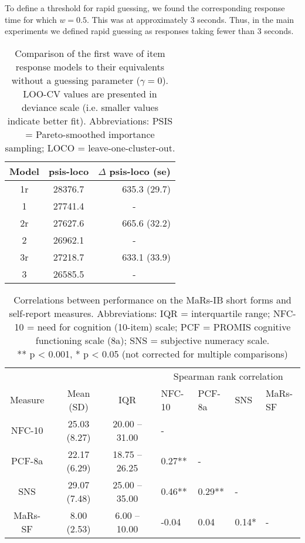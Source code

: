 \documentclass[a4paper,man,natbib]{apa6}
\begin{document}
To define a threshold for rapid guessing, we found the corresponding response time for which $w = 0.5$. This was at approximately 3 seconds. Thus, in the main experiments we defined rapid guessing as responses taking fewer than 3 seconds. 




\begin{table}
    \centering
    \begin{tabular*}{0.45\textwidth}{ccr}
    \toprule
    Model & psis-loco & $\Delta$ psis-loco (se) \\
    \midrule
    1r & 28376.7 & 635.3 (29.7) \\
    1 & 27741.4 & \multicolumn{1}{c}{-} \\
    \midrule
    2r & 27627.6 & 665.6 (32.2) \\
    2 & 26962.1 & \multicolumn{1}{c}{-} \\
    \midrule
    3r & 27218.7 & 633.1 (33.9) \\
    3 & 26585.5 & \multicolumn{1}{c}{-} \\
    \bottomrule
    \end{tabular*}
    \caption{\label{tab:2}\normalfont Comparison of the first wave of item response models to their equivalents without a guessing parameter ($\gamma = 0$). LOO-CV values are presented in deviance scale (i.e. smaller values indicate better fit). Abbreviations: PSIS = Pareto-smoothed importance sampling; LOCO = leave-one-cluster-out.}
    \label{table:2}
\end{table}

\begin{table}
\centering
\begin{tabular*}{\textwidth}{ccccccllll}
\toprule
 & & & & & & \multicolumn{4}{c}{Spearman rank correlation} \\
\cmidrule(lr){7-10}
Measure & & Mean (SD) & & IQR & &  NFC-10 & PCF-8a & SNS & MaRs-SF \\
\midrule
NFC-10 & & 25.03 (8.27) & & 20.00 -- 31.00 & & - &  &  & \\
PCF-8a   &  & 22.17 (6.29) & & 18.75 -- 26.25 & & 0.27** &  - &  &  \\
SNS   &  & 29.07 (7.48) & & 25.00 -- 35.00 & & 0.46** &  0.29** &  - &   \\
MaRs-SF & &   8.00 (2.53) & &   6.00 -- 10.00 & & -0.04 &  0.04 &  0.14* &  - \\
\bottomrule
\end{tabular*}
\captionsetup{width=1.\textwidth}
\caption{\normalfont Correlations between performance on the MaRs-IB short forms and self-report measures. Abbreviations: IQR = interquartile range; NFC-10 = need for cognition (10-item) scale; PCF = PROMIS cognitive functioning scale (8a); SNS = subjective numeracy scale. \\ ** p < 0.001,  * p < 0.05 (not corrected for multiple comparisons)}
\end{table}
\end{document}
